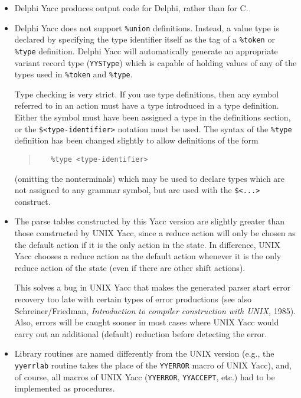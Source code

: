 \documentclass[a4paper]{article}
\begin{document}
\begin{itemize}
   \item
      Delphi Yacc produces output code for Delphi, rather than for C.
   \item
      Delphi Yacc does not support \verb"%union" definitions. Instead, a value
      type is declared by specifying the type identifier itself as the tag of
      a \verb"%token" or \verb"%type" definition. Delphi Yacc will automatically
      generate an appropriate variant record type (\verb"YYSType") which is
      capable of holding values of any of the types used in \verb"%token" and
      \verb"%type".
    
      Type checking is very strict. If you use type definitions, then
      any symbol referred to in an action must have a type introduced
      in a type definition. Either the symbol must have been assigned a
      type in the definitions section, or the \verb"$<type-identifier>"
      notation must be used. The syntax of the \verb"%type" definition has
      been changed slightly to allow definitions of the form
      \begin{quote}\begin{verbatim}
   %type <type-identifier>
      \end{verbatim}\end{quote}
      (omitting the nonterminals) which may be used to declare types which
      are not assigned to any grammar symbol, but are used with the
      \verb"$<...>" construct.
   \item
      The parse tables constructed by this Yacc version are slightly greater
      than those constructed by UNIX Yacc, since a reduce action will only be
      chosen as the default action if it is the only action in the state.
      In difference, UNIX Yacc chooses a reduce action as the default action
      whenever it is the only reduce action of the state (even if there are
      other shift actions).
    
      This solves a bug in UNIX Yacc that makes the generated parser start
      error recovery too late with certain types of error productions (see
      also Schreiner/Friedman, {\em Introduction to compiler construction with
      UNIX,\/} 1985). Also, errors will be caught sooner in most cases where
      UNIX Yacc would carry out an additional (default) reduction before
      detecting the error.
   \item
      Library routines are named differently from the UNIX version (e.g.,
      the \verb"yyerrlab" routine takes the place of the \verb"YYERROR"
      macro of UNIX Yacc), and, of course, all macros of UNIX Yacc
      (\verb"YYERROR", \verb"YYACCEPT", etc.) had to be implemented as
      procedures.
\end{itemize}
\end{document}
